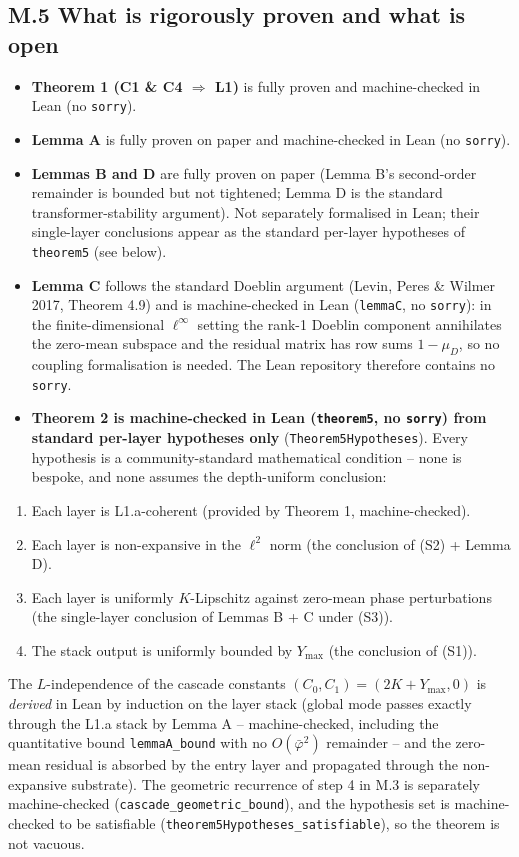 \documentclass[11pt,a4paper]{article}
\theoremstyle{plain}
\theoremstyle{definition}
\begin{document}
\subsection*{M.5 What is rigorously proven and what is open}
\begin{itemize}
  \item \textbf{Theorem 1 (C1 \& C4 $\Rightarrow$ L1)} is fully proven and machine-checked in Lean (no \texttt{sorry}).
  \item \textbf{Lemma A} is fully proven on paper and machine-checked in Lean (no \texttt{sorry}).
  \item \textbf{Lemmas B and D} are fully proven on paper (Lemma B's second-order remainder is bounded but not tightened; Lemma D is the standard transformer-stability argument). Not separately formalised in Lean; their single-layer conclusions appear as the standard per-layer hypotheses of \texttt{theorem5} (see below).
  \item \textbf{Lemma C} follows the standard Doeblin argument (Levin, Peres \& Wilmer 2017, Theorem 4.9) and is machine-checked in Lean (\texttt{lemmaC}, no \texttt{sorry}): in the finite-dimensional $\ell^\infty$ setting the rank-1 Doeblin component annihilates the zero-mean subspace and the residual matrix has row sums $1 - \mu_D$, so no coupling formalisation is needed. The Lean repository therefore contains no \texttt{sorry}.
  \item \textbf{Theorem 2 is machine-checked in Lean (\texttt{theorem5}, no \texttt{sorry}) from standard per-layer hypotheses only} (\texttt{Theorem5Hypotheses}). Every hypothesis is a community-standard mathematical condition -- none is bespoke, and none assumes the depth-uniform conclusion:
\end{itemize}

\begin{enumerate}
  \item Each layer is L1.a-coherent (provided by Theorem 1, machine-checked).
  \item Each layer is non-expansive in the $\ell^2$ norm (the conclusion of (S2) + Lemma D).
  \item Each layer is uniformly $K$-Lipschitz against zero-mean phase perturbations (the single-layer conclusion of Lemmas B + C under (S3)).
  \item The stack output is uniformly bounded by $Y_{\max}$ (the conclusion of (S1)).
\end{enumerate}

The $L$-independence of the cascade constants $(C_0, C_1) = (2K + Y_{\max}, 0)$ is \emph{derived} in Lean by induction on the layer stack (global mode passes exactly through the L1.a stack by Lemma A -- machine-checked, including the quantitative bound \texttt{lemmaA\_bound} with no $O(\bar\varphi^2)$ remainder -- and the zero-mean residual is absorbed by the entry layer and propagated through the non-expansive substrate). The geometric recurrence of step 4 in M.3 is separately machine-checked (\texttt{cascade\_geometric\_bound}), and the hypothesis set is machine-checked to be satisfiable (\texttt{theorem5Hypotheses\_satisfiable}), so the theorem is not vacuous.
\end{document}
